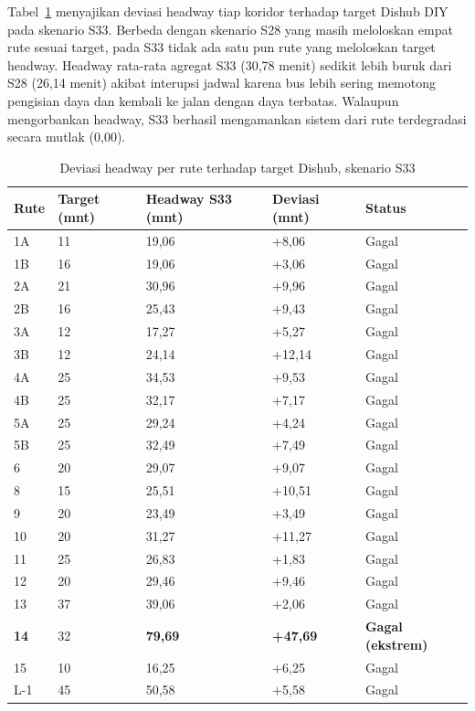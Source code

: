 Tabel~\ref{tab:eval-per-rute-s33} menyajikan deviasi headway tiap koridor
terhadap target Dishub DIY pada skenario S33. Berbeda dengan skenario S28 yang
masih meloloskan empat rute sesuai target, pada S33 tidak ada satu pun rute
yang meloloskan target headway. Headway rata-rata agregat S33 (30,78 menit)
sedikit lebih buruk dari S28 (26,14 menit) akibat interupsi jadwal karena
bus lebih sering memotong pengisian daya dan kembali ke jalan dengan daya
terbatas. Walaupun mengorbankan headway, S33 berhasil mengamankan sistem
dari rute terdegradasi secara mutlak (0,00).

\begin{table}[h]
	\centering
	\caption{Deviasi headway per rute terhadap target Dishub, skenario S33}
	\label{tab:eval-per-rute-s33}
	\begin{tabular}{|l|l|l|l|l|}
		\hline
		\textbf{Rute} & \textbf{Target (mnt)} & \textbf{Headway S33 (mnt)} & \textbf{Deviasi (mnt)} & \textbf{Status} \\
		\hline
		1A & 11 & 19,06 & +8,06 & Gagal \\ \hline
		1B & 16 & 19,06 & +3,06 & Gagal \\ \hline
		2A & 21 & 30,96 & +9,96 & Gagal \\ \hline
		2B & 16 & 25,43 & +9,43 & Gagal \\ \hline
		3A & 12 & 17,27 & +5,27 & Gagal \\ \hline
		3B & 12 & 24,14 & +12,14 & Gagal \\ \hline
		4A & 25 & 34,53 & +9,53 & Gagal \\ \hline
		4B & 25 & 32,17 & +7,17 & Gagal \\ \hline
		5A & 25 & 29,24 & +4,24 & Gagal \\ \hline
		5B & 25 & 32,49 & +7,49 & Gagal \\ \hline
		6 & 20 & 29,07 & +9,07 & Gagal \\ \hline
		8 & 15 & 25,51 & +10,51 & Gagal \\ \hline
		9 & 20 & 23,49 & +3,49 & Gagal \\ \hline
		10 & 20 & 31,27 & +11,27 & Gagal \\ \hline
		11 & 25 & 26,83 & +1,83 & Gagal \\ \hline
		12 & 20 & 29,46 & +9,46 & Gagal \\ \hline
		13 & 37 & 39,06 & +2,06 & Gagal \\ \hline
		\textbf{14} & 32 & \textbf{79,69} & \textbf{+47,69} & \textbf{Gagal (ekstrem)} \\ \hline
		15 & 10 & 16,25 & +6,25 & Gagal \\ \hline
		L-1 & 45 & 50,58 & +5,58 & Gagal \\ \hline
	\end{tabular}
\end{table}

